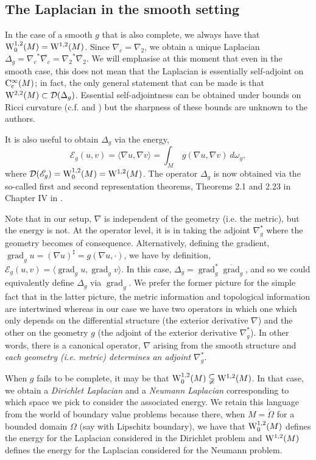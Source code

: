 \documentclass[AMS,STIX1COL]{WileyNJD-v2}
\numberwithin{equation}{section}
\renewcommand{\~}{\tilde}
\renewcommand{\-}{\bar}
\newcommand{\8}{\infty}
\DeclareMathOperator{\grad}{grad}
\newcommand{\dom}{ {\mathcal{D}}}
\newcommand{\script}[1]{\mathscr{#1}}
\newcommand{\close}[1]{\overline{#1}}		%
\newcommand{\interior}[1]{\mathring{#1}}	%
\newcommand{\adj}[1]{{#1}^\ast}			%
\newcommand{\inprod}[1]{\langle #1 \rangle}	%
\newcommand{\Ck}[2][{}]{{\rm C}^{#2}_{\rm #1}}		%
\newcommand{\Sob}[2][{}]{{\rm W}^{#2}_{\rm #1}}		%
\newcommand{\SobH}[2][{}]{{\Sob[#1]{#2,2}}}	%
\newcommand{\sE}{\script{E}}
\begin{document}
\subsection{The Laplacian in the smooth setting}

In the case of a smooth $g$ that is also complete, we
always have that $\SobH[0]{1}(M) = \SobH{1}(M)$. 
Since $\nabla_c = \nabla_2$, we obtain 
a unique Laplacian $\Delta_g = \adj{\nabla_c} \close{\nabla_c} = \adj{\nabla_2}\close{\nabla_2}$.
We will emphasise at this moment that even in the smooth case, this does not mean that the Laplacian is essentially self-adjoint on $\Ck[c]{\infty}(M)$; in fact, the only general statement that can be made is that $\SobH{2}(M) \subset \dom(\Delta_g)$. 
Essential self-adjointness can be obtained under bounds on Ricci curvature (c.f. \cite{IRV} and \cite{BDensity}) but the sharpness of these bounds are unknown to the authors.

It is also useful to obtain $\Delta_g$ via the energy,
$$\sE_g(u,v) = \inprod{\nabla u, \nabla v} = \int_M\ g(\nabla u, \nabla v)\ d\omega_g,$$
where $\dom(\sE_g) = \SobH[0]{1}(M) = \SobH{1}(M)$.
The operator $\Delta_g$ is now obtained via the so-called first and second representation 
theorems, Theorems 2.1 and 2.23 in Chapter IV  in \cite{Kato}.
 
Note that in our setup, $\nabla$ is independent of the geometry (i.e. the metric), but the energy is not. At the operator level, it is in taking the adjoint $\adj{\nabla}_g$ where the geometry becomes of consequence. Alternatively, defining the gradient, $\grad_g u =  (\nabla u)^\sharp = g(\nabla u, \cdot)$, we have by definition, $\sE_g(u,v) = \inprod{\grad_g u, \grad_g v}$. In this case, $\Delta_g = \adj{\grad}_g \close{\grad}_g$, and so we could equivalently define \(\Delta_g\) via \(\grad_g\). We prefer the former picture for the simple fact that in the latter picture, the metric information and topological information are intertwined whereas in our case we have two operators in which one which only depends on the differential structure (the exterior derivative $\nabla$) and the other on the geometry $g$ (the adjoint of the exterior derivative $\nabla^\ast_g$). In other words, there is a canonical
operator, $\nabla$ arising from the smooth structure and \emph{each geometry (i.e. metric) determines an adjoint $\nabla^{\ast}_g$}.


When $g$ fails to be complete, it may be that  
$\SobH[0]{1}(M) \subsetneqq  \SobH{1}(M)$.
In that case, we obtain a \emph{Dirichlet Laplacian} and  a \emph{Neumann 
Laplacian} corresponding to which space we pick 
to consider the associated energy.
We retain this language from the world of boundary 
value problems because there, when $M = \interior\Omega$
for a bounded domain $\Omega$ (say with Lipschitz boundary), we have that
$\SobH[0]{1}(M)$ defines the energy for
the Laplacian considered in the Dirichlet problem
and $\SobH{1}(M)$ defines the energy 
for the Laplacian considered for the Neumann problem.
\end{document}
